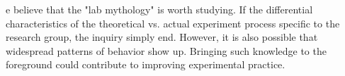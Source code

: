 e believe that the "lab mythology" is worth studying. If the differential characteristics of the theoretical vs. actual experiment process  specific to the research group, the inquiry  simply end. However, it is also possible that widespread patterns of behavior show up. Bringing such knowledge to the foreground could contribute to improving experimental practice.